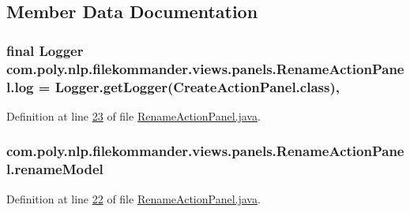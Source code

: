 \subsection{Member Data Documentation}
\hypertarget{classcom_1_1poly_1_1nlp_1_1filekommander_1_1views_1_1panels_1_1_rename_action_panel_a4e84c4017b3461afab7a58319fca6dcc}{
\subsubsection[{log}]{\setlength{\rightskip}{0pt plus 5cm}final Logger com.\-poly.\-nlp.\-filekommander.\-views.\-panels.\-Rename\-Action\-Panel.\-log = Logger.\-get\-Logger(Create\-Action\-Panel.\-class)\hspace{0.3cm}{\ttfamily [static]}, {\ttfamily [private]}}}\label{classcom_1_1poly_1_1nlp_1_1filekommander_1_1views_1_1panels_1_1_rename_action_panel_a4e84c4017b3461afab7a58319fca6dcc}


Definition at line \hyperlink{L23}{23} of file \hyperlink{}{Rename\-Action\-Panel.\-java}.

\hypertarget{classcom_1_1poly_1_1nlp_1_1filekommander_1_1views_1_1panels_1_1_rename_action_panel_a6225fd2a8c41ace06f7cbf690ff1fa66}{
\subsubsection[{rename\-Model}]{ com.\-poly.\-nlp.\-filekommander.\-views.\-panels.\-Rename\-Action\-Panel.\-rename\-Model\hspace{0.3cm}{\ttfamily [private]}}}\label{classcom_1_1poly_1_1nlp_1_1filekommander_1_1views_1_1panels_1_1_rename_action_panel_a6225fd2a8c41ace06f7cbf690ff1fa66}


Definition at line \hyperlink{L22}{22} of file \hyperlink{}{Rename\-Action\-Panel.\-java}.


